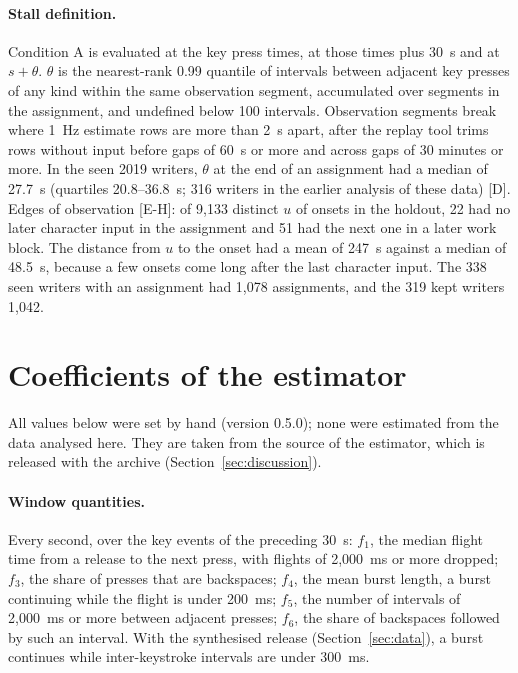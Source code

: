 \paragraph{Stall definition.} Condition A is evaluated at the key press times, at those times plus 30~s and at $s +
\theta$. $\theta$ is the nearest-rank 0.99 quantile of intervals between adjacent key presses of any kind within the
same observation segment, accumulated over segments in the assignment, and undefined below 100 intervals. Observation
segments break where 1~Hz estimate rows are more than 2~s apart, after the replay tool trims rows without input before
gaps of 60~s or more and across gaps of 30 minutes or more. In the seen 2019 writers, $\theta$ at the end of an
assignment had a median of 27.7~s (quartiles 20.8--36.8~s; 316 writers in the earlier analysis of these data) [D].
Edges of observation [E-H]: of 9,133 distinct $u$ of onsets in the holdout, 22 had no later character input in the
assignment and 51 had the next one in a later work block. The distance from $u$ to the onset had a mean of 247~s against
a median of 48.5~s, because a few onsets come long after the last character input. The 338 seen writers with an assignment had 1,078
assignments, and the 319 kept writers 1,042.

\section{Coefficients of the estimator}
\label{app:coefficients}

All values below were set by hand (version 0.5.0); none were estimated from the data analysed here. They are taken
from the source of the estimator, which is released with the archive (Section~\ref{sec:discussion}).

\paragraph{Window quantities.} Every second, over the key events of the preceding 30~s: $f_1$, the median flight time
from a release to the next press, with flights of 2,000~ms or more dropped; $f_3$, the share of presses that are
backspaces; $f_4$, the mean burst length, a burst continuing while the flight is under 200~ms; $f_5$, the number of
intervals of 2,000~ms or more between adjacent presses; $f_6$, the share of backspaces followed by such an interval.
With the synthesised release (Section~\ref{sec:data}), a burst continues while inter-keystroke intervals are under
300~ms.

